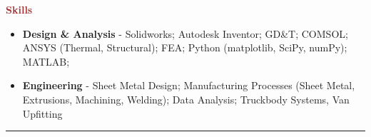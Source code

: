 \documentclass[11pt, letterpaper]{article}
\begin{document}
\noindent \textbf{\large \textcolor{Brown}{Skills}}\\
\begin{itemize}[leftmargin=*]
\setlength\itemsep{-2pt}
\vspace{-8pt}
\item \textbf{Design \& Analysis} - Solidworks; Autodesk Inventor; GD\&T; COMSOL; ANSYS (Thermal, Structural); FEA; Python (matplotlib, SciPy, numPy); MATLAB;
\item \textbf{Engineering} - Sheet Metal Design; Manufacturing Processes (Sheet Metal, Extrusions, Machining, Welding); Data Analysis; Truckbody Systems, Van Upfitting
\end{itemize}
\vspace{-8pt}
\noindent \rule[2pt]{\textwidth}{0.5pt}
\end{document}
